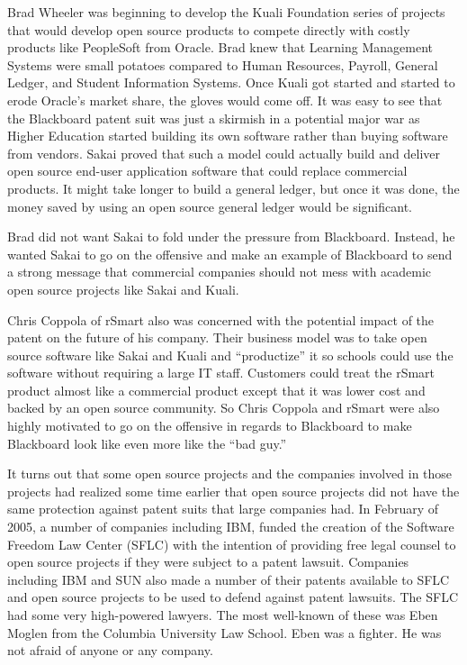 \documentclass[12pt]{book}
\begin{document}
Brad Wheeler was beginning to develop the Kuali Foundation
series of projects that would develop open source products to
compete directly with costly products like PeopleSoft
from Oracle.  Brad knew that Learning Management Systems were
small potatoes compared to Human Resources, Payroll, General
Ledger, and Student Information Systems.  Once Kuali got
started and started to erode Oracle's market share, the
gloves would come off.  It was easy to see that the Blackboard
patent suit was just a skirmish in a potential major war
as Higher Education started building its own software rather
than buying software from vendors.  Sakai proved that such
a model could actually build and deliver open source
end-user application software that could replace commercial
products.  It might take longer to build a general ledger,
but once it was done, the money saved by using an open
source general ledger would be significant.

Brad did not want Sakai to fold under the pressure from
Blackboard.  Instead, he wanted Sakai to go on the offensive
and make an example of Blackboard to send a strong message
that commercial companies should not mess with academic
open source projects like Sakai and Kuali.

Chris Coppola of rSmart also was concerned with the
potential impact of the patent on the future of
his company.  Their business model was to take open
source software like Sakai and Kuali and
``productize'' it so schools could use the software without
requiring a large IT staff.  Customers could treat the
rSmart product almost like a commercial product except
that it was lower cost and backed by an open source community.
So Chris Coppola and rSmart were also highly motivated
to go on the offensive in regards to Blackboard to
make Blackboard look like even more like the ``bad guy.''

It turns out that some open source projects and the
companies involved in those projects had realized some
time earlier that open source projects did not have the same
protection against patent suits that large companies had.
In February of 2005, a number of companies including IBM,
funded the creation of the Software Freedom Law Center (SFLC)
with the intention of providing free legal counsel to
open source projects if they were subject to a patent
lawsuit.   Companies including IBM and SUN also made
a number of their patents available to SFLC and open source
projects to be used to defend against patent lawsuits.
The SFLC had some very high-powered lawyers.  The most well-known
of these was Eben Moglen from the Columbia University Law School.
Eben was a fighter.  He was not afraid of anyone or any company.
\end{document}
